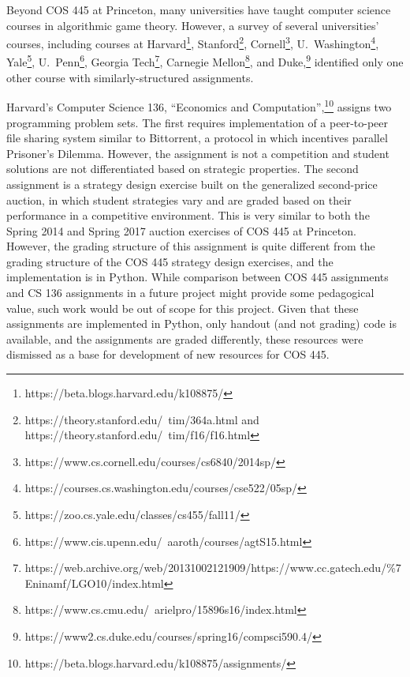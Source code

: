 \documentclass[pageno]{jpaper}
\begin{document}
Beyond COS 445 at Princeton, many universities have taught computer science courses in algorithmic game theory.
However, a survey of several universities' courses, including courses at Harvard\footnote{https://beta.blogs.harvard.edu/k108875/}, Stanford\footnote{https://theory.stanford.edu/~tim/364a.html and https://theory.stanford.edu/~tim/f16/f16.html}, Cornell\footnote{https://www.cs.cornell.edu/courses/cs6840/2014sp/}, U.\ Washington\footnote{https://courses.cs.washington.edu/courses/cse522/05sp/}, Yale\footnote{https://zoo.cs.yale.edu/classes/cs455/fall11/}, U.\ Penn\footnote{https://www.cis.upenn.edu/~aaroth/courses/agtS15.html}, Georgia Tech\footnote{https://web.archive.org/web/20131002121909/https://www.cc.gatech.edu/\%7Eninamf/LGO10/index.html}, Carnegie Mellon\footnote{https://www.cs.cmu.edu/~arielpro/15896s16/index.html}, and Duke,\footnote{https://www2.cs.duke.edu/courses/spring16/compsci590.4/} identified only one other course with similarly-structured assignments.

Harvard's Computer Science 136, ``Economics and Computation'',\footnote{https://beta.blogs.harvard.edu/k108875/assignments/} assigns two programming problem sets.
The first requires implementation of a peer-to-peer file sharing system similar to Bittorrent, a protocol in which incentives parallel Prisoner's Dilemma.
However, the assignment is not a competition and student solutions are not differentiated based on strategic properties.
The second assignment is a strategy design exercise built on the generalized second-price auction, in which student strategies vary and are graded based on their performance in a competitive environment.
This is very similar to both the Spring 2014 and Spring 2017 auction exercises of COS 445 at Princeton.
However, the grading structure of this assignment is quite different from the grading structure of the COS 445 strategy design exercises, and the implementation is in Python.
While comparison between COS 445 assignments and CS 136 assignments in a future project might provide some pedagogical value, such work would be out of scope for this project.
Given that these assignments are implemented in Python, only handout (and not grading) code is available, and the assignments are graded differently, these resources were dismissed as a base for development of new resources for COS 445.
\end{document}
